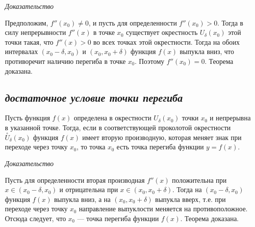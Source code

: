 \textit{Доказательство}

Предположим, $f''(x_0) \neq 0$, и пусть для определенности $f''(x_0) > 0$. Тогда в силу непрерывности $f
''(x)$ в точке $x_0$ существует окрестность $U_\delta(x_0)$ этой точки такая, что $f
''(x) > 0$ во всех точках этой окрестности. Тогда на обоих интервалах $(x_0 − \delta, x_0)$ и $(x_0, x_0 + \delta)$ функция $f(x)$ выпукла вниз, что противоречит наличию перегиба в точке $x_0$. Поэтому $f''(x_0) = 0$. Теорема доказана.
\subsection{\textit{достаточное условие точки перегиба}}

Пусть функция $f(x)$ определена в окрестности $U_\delta(x_0)$ точки $x_0$ и непрерывна в указанной точке. Тогда, если в соответствующей проколотой окрестности $\overset{\circ}U_\delta(x_0)$ функция $f(x)$ имеет вторую производную, которая меняет знак при переходе через точку $x_0$, то точка $x_0$ есть точка перегиба функции $y = f(x)$.

\textit{Доказательство}

Пусть для определенности вторая производная $f
''(x)$ положительна при $x \in (x_0 - \delta, x_0)$ и отрицательна при $x \in (x_0, x_0 + \delta)$. Тогда на $(x_0 −\delta, x_0)$ функция $f(x)$ выпукла вниз, а на $(x_0, x_0 + \delta)$ выпукла вверх, т.е. при переходе через точку $x_0$ направление выпуклости меняется на противоположное. Отсюда следует, что $x_0$ — точка перегиба функции $f(x)$. Теорема доказана.


    